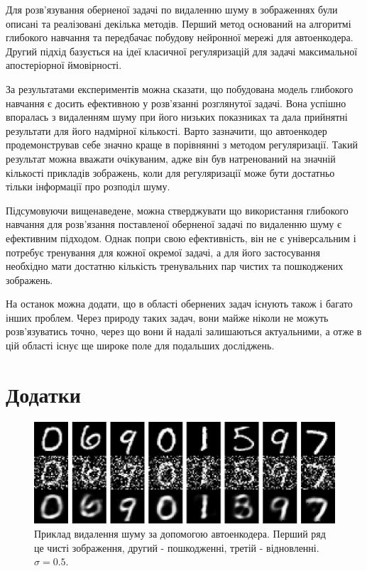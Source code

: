 \documentclass[14pt,a4paper]{extarticle}
\newcounter{e}
\numberwithin{equation}{section}
\numberwithin{figure}{section}
\begin{document}
	Для розв'язування оберненої задачі по видаленню шуму в зображеннях були описані та реалізовані декілька методів. Перший метод оснований на алгоритмі глибокого навчання та передбачає побудову нейронної мережі для автоенкодера. Другий підхід базується на ідеї класичної регуляризацій для задачі максимальної апостеріорної ймовірності. 
	
	За результатами експериментів можна сказати, що побудована модель глибокого навчання є досить ефективною у розв'язанні розглянутої задачі. Вона успішно впоралась з видаленням шуму при його низьких показниках та дала прийнятні результати для його надмірної кількості. Варто зазначити, що автоенкодер продемонстрував себе значно краще в порівнянні з методом регуляризації. Такий результат можна вважати очікуваним, адже він був натренований на значній кількості прикладів зображень, коли для регуляризації може бути достатньо тільки інформації про розподіл шуму.
	
	Підсумовуючи вищенаведене, можна стверджувати що використання глибокого навчання для розв'язання поставленої оберненої задачі по видаленню шуму є ефективним підходом. Однак попри свою ефективність, він не є універсальним і потребує тренування для кожної окремої задачі, а для його застосування необхідно мати достатню кількість тренувальних пар чистих та пошкоджених зображень.
	
	На останок можна додати, що в області обернених задач існують також і багато інших проблем. Через природу таких задач, вони майже ніколи не можуть розв'язуватись точно, через що вони й надалі залишаються актуальними, а отже в цій області існує ще широке поле для подальших досліджень.

	\newpage
	\thispagestyle{empty}
	\section*{Додатки}

	\begin{figure}[H]
		\centering
		\includegraphics[width=1\textwidth]{../resources/autoencoder-denoising-samples.pdf}
		\caption{Приклад видалення шуму за допомогою автоенкодера. Перший ряд це чисті зображення, другий - пошкодженні, третій - відновленні. $\sigma=0.5$.}
		\label{fig:autoencoder-denoising-samples}
	\end{figure}	
	
\end{document}
